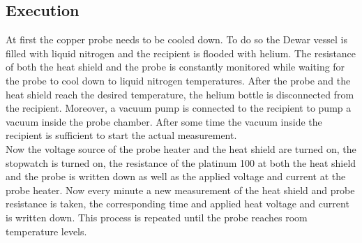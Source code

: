 \subsection{Execution}
At first the copper probe needs to be cooled down.
To do so the Dewar vessel is filled with liquid nitrogen and the recipient is flooded with helium.
The resistance of both the heat shield and the probe is constantly monitored while waiting for the probe to cool down to liquid nitrogen temperatures.
After the probe and the heat shield reach the desired temperature, the helium bottle is disconnected from the recipient.
Moreover, a vacuum pump is connected to the recipient to pump a vacuum inside the probe chamber.
After some time the vacuum inside the recipient is sufficient to start the actual measurement. \\
Now the voltage source of the probe heater and the heat shield are turned on, the stopwatch is turned on, the resistance of the platinum 100 at both the heat shield and the probe is written down as well as the applied voltage and current at the probe heater.
Now every minute a new measurement of the heat shield and probe resistance is taken, the corresponding time and applied heat voltage and current is written down.
This process is repeated until the probe reaches room temperature levels.
